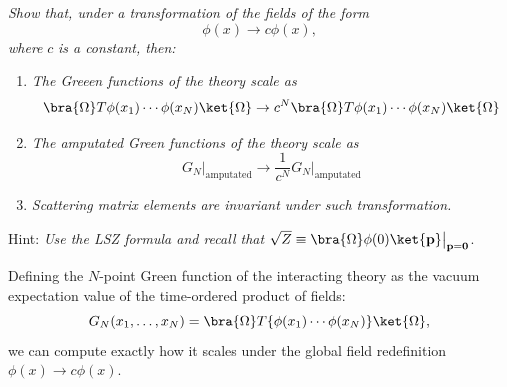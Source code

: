 \begin{center}
    \textit{Show that, under a transformation of the fields of the form}
    \[
        \phi(x) \to c \phi(x),
    \]
    \textit{where} \(c\) \textit{is a constant, then:}
    \begin{enumerate}[label=(\alph*)]
        \item \textit{The Greeen functions of the theory scale as}
              \[
                  \bra{\Omega} T \phi(x_1) \cdots \phi(x_N) \ket{\Omega} \to c^N \bra{\Omega} T \phi(x_1) \cdots \phi(x_N) \ket{\Omega}
              \]
        \item \textit{The amputated Green functions of the theory scale as}
              \[
                  G_N \big|_{\text{amputated}} \to \frac{1}{c^N} G_N \big|_{\text{amputated}}
              \]
        \item \textit{Scattering matrix elements are invariant under such transformation.}
    \end{enumerate}
    Hint: \textit{Use the LSZ formula and recall that} \(\sqrt{Z} \equiv \bra{\Omega} \phi(0) \ket{\mathbf{p}} \big|_{\mathbf{p} = \mathbf{0}}\).
\end{center}

Defining the $N$-point Green function of the interacting theory as the vacuum expectation value of the time-ordered product of fields:
\[
    G_N (x_1, \dots, x_N) = \bra{\Omega} T \{ \phi(x_1) \cdots \phi(x_N) \} \ket{\Omega},
\]
we can compute exactly how it scales under the global field redefinition $\phi(x) \to c\phi(x)$.

